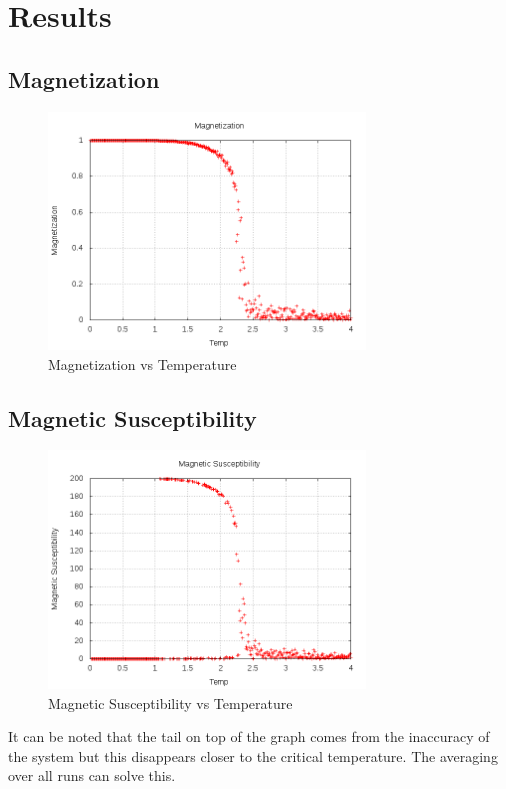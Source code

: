 \documentclass[letterpaper,12pt]{article}
\numberwithin{equation}{subsection}
\begin{document}
\section{Results}
\subsection{Magnetization}
\begin{figure}[H]
        \centering
        \caption{Magnetization vs Temperature \label{fig:magvsT}}
                \centering
                \includegraphics[width=0.75\textwidth]{MagVsT.png}
\end{figure}
\subsection{Magnetic Susceptibility}
\begin{figure}[H]
        \centering
        \caption{Magnetic Susceptibility vs Temperature \label{fig:chivsT}}
                \centering
                \includegraphics[width=0.75\textwidth]{chiVsT.png}
\end{figure}
It can be noted that the tail on top of the graph comes from the inaccuracy of the system but this disappears closer to the critical temperature. The averaging over all runs can solve this. 
\end{document}
